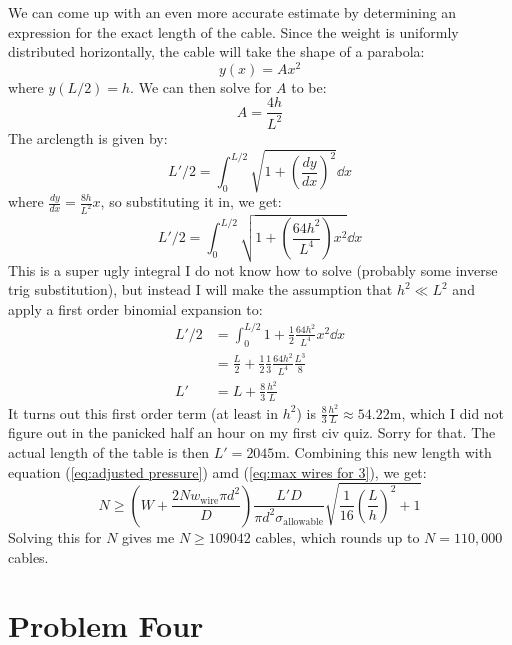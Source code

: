 \documentclass{article}
\begin{document}
We can come up with an even more accurate estimate by determining an expression for the exact length of the cable. Since the weight is uniformly distributed horizontally, the cable will take the shape of a parabola:
\begin{equation}
    y(x)=Ax^2
    \label{eq:}
\end{equation}
where $y(L/2)=h$. We can then solve for $A$ to be:
\begin{equation}
    A = \frac{4h}{L^2}
    \label{eq:}
\end{equation}
The arclength is given by:
\begin{equation}
    L'/2 =\int_0^{L/2}\sqrt{1+\left(\frac{dy}{dx}\right)^2}\dd{x}
    \label{eq:}
\end{equation}
where $\displaystyle \frac{dy}{dx}=\frac{8h}{L^2}x$, so substituting it in, we get:
\begin{equation}
    L'/2 = \int_0^{L/2}\sqrt{1+\left(\frac{64h^2}{L^4}\right)x^2}\dd{x}
    \label{eq:}
\end{equation}
This is a super ugly integral I do not know how to solve (probably some inverse trig substitution), but instead I will make the assumption that $h^2 \ll L^2$ and apply a first order binomial expansion to:
\begin{align}
    L'/2 &= \int_0^{L/2} 1+\frac{1}{2}\frac{64h^2}{L^4}x^2 \dd{x} \\ 
    &= \frac{L}{2}+\frac{1}{2}\frac{1}{3}\frac{64h^2}{L^4}\frac{L^3}{8} \\
    L' &= L + \frac{8}{3}\frac{h^2}{L} 
    \label{eq:}
\end{align}
It turns out this first order term (at least in $h^2$) is $\displaystyle \frac{8}{3}\frac{h^2}{L}\approx 54.22\si{\meter}$, which I did not figure out in the panicked half an hour on my first civ quiz. Sorry for that. The actual length of the table is then $L'=2045\si{\meter}.$ Combining this new length with equation (\ref{eq:adjusted pressure}) amd (\ref{eq:max wires for 3}), we get:
\begin{equation}
    N \ge \left(W + \frac{2Nw_\text{wire}\pi d^2}{D}\right)\frac{L'D}{\pi d^2\sigma_\text{allowable}}\sqrt{\frac{1}{16}\left(\frac{L}{h}\right)^2+1}
    \label{eq:}
\end{equation}
Solving this for $N$ gives me $N \ge 109042$ cables, which rounds up to $N=110,000$ cables.

\newpage
\section{Problem Four}
\end{document}
